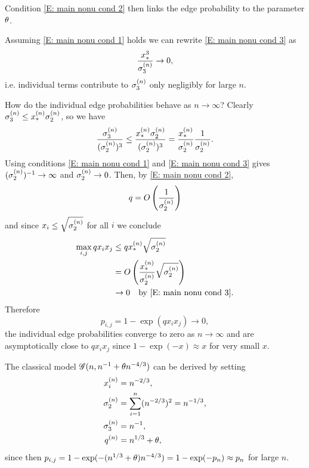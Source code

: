Condition \eqref{E: main nonu cond 2} then links the edge probability to the parameter $\theta$.

Assuming \eqref{E: main nonu cond 1} holds we can rewrite \eqref{E: main nonu cond 3} as
\begin{equation}
	\frac{x_*^3}{\sigma^{(n)}_3} \rightarrow 0,
\end{equation}
i.e. individual terms contribute to $\sigma^{(n)}_3$ only negligibly for large $n$.

How do the individual edge probabilities behave as $n \rightarrow \infty$?
Clearly $\sigma^{(n)}_3 \leq x_*^{(n)} \sigma^{(n)}_2$, so we have
\begin{equation}
	\frac{\sigma^{(n)}_3}{(\sigma^{(n)}_2)^3} \leq \frac{x_*^{(n)} \sigma^{(n)}_2}{(\sigma^{(n)}_2)^3} = \frac{x_*^{(n)}}{\sigma^{(n)}_2}\frac{1}{\sigma^{(n)}_2}.
\end{equation}
Using conditions \eqref{E: main nonu cond 1} and \eqref{E: main nonu cond 3} gives
$(\sigma^{(n)}_2)^{-1} \rightarrow \infty$ and $\sigma^{(n)}_2 \rightarrow 0$.
Then, by \eqref{E: main nonu cond 2},
\begin{equation}
	q = O\left(\frac{1}{\sigma^{(n)}_2}\right)
\end{equation}
and since $x_i \leq \sqrt{\sigma^{(n)}_2}$ for all $i$ we conclude
\begin{equation}
	\begin{aligned}
	\max_{i,j} q x_i x_j 
	&\leq q x_*^{(n)} \sqrt{\sigma^{(n)}_2} \\
	&= O\left( \frac{x_*^{(n)}}{\sigma^{(n)}_2} \sqrt{\sigma^{(n)}_2} \right) \\
	&\rightarrow 0 \quad \text{by \eqref{E: main nonu cond 3}}.
	\end{aligned}
\end{equation}
Therefore
\begin{equation}
	p_{i,j} = 1 - \exp(q x_i x_j) \rightarrow 0,
\end{equation}
the individual edge probabilities converge to zero as $n \rightarrow \infty$
and are asymptotically close to $qx_i x_j$ since $1 - \exp(-x) \approx x$ for very small $x$.

The classical model $\mathscr{G}(n, n^{-1} + \theta n^{-4/3})$ can be derived by setting
\begin{equation}
\begin{aligned}
	x_i^{(n)} &= n^{-2 / 3},  \\
	\sigma^{(n)}_2 &= \sum_{i = 1}^{n} (n^{-2 / 3})^2 = n^{-1 / 3}, \\
	\sigma^{(n)}_3 &= n^{-1}, \\
	q^{(n)} &= n^{1 / 3} + \theta,
\end{aligned}
\end{equation}
since then $p_{i,j} = 1 - \exp(-(n^{1 / 3} + \theta)n^{-4 / 3}) = 1 - \exp(-p_n) \approx p_n$ for large $n$.


